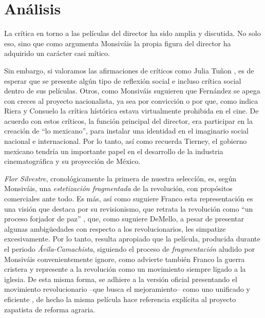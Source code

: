 \section{Análisis}
La crítica en torno a las películas del director ha sido amplia y discutida. No solo eso, sino que como argumenta Monsiváis\autocite[445]{cosio_villegas_notas_1976} la propia figura del director ha adquirido un carácter casi mítico.

Sin embargo, si valoramos las afirmaciones de críticos como Julia Tuñon\autocite[466]{pablos_escuela_1998-1}\autocite[466]{pablos_escuela_1998-1}
 , es de esperar que se presente algún tipo de reflexión social e incluso crítica social dentro de sus películas. 
Otros, como Monsiváis\autocite[444]{cosio_villegas_notas_1976}
suguieren que Fernández se apega con creces 
al proyecto nacionalista, ya sea por convicción o por que, como indica Riera\autocite[111]{garcia_riera_historia_1992}
y  Consuelo\autocite[179]{guerrero_imagen_2005}
la crítica hístórica estava virtualmente prohibida en el cine. De acuerdo con estos críticos, la función principal del director, era participar en la creación de ``lo mexicano'', para instalar una identidad en el imaginario social nacional e internacional\autocite[12]{silva_escobar_epoca_2011}.
Por lo tanto, así como recuerda Tierney, el gobierno mexicano tendría un importante papel en el desarrollo de la industria cinematográfica y su proyección de México\autocite[35]{tierney_myths_2002}.

\emph{Flor Silvestre}, cronológicamente\autocite[17]{garcia_riera_historia_1992}
la primera de nuestra seleccíón, es, según Monsiváis, 
una \emph{estetización fragmentada}\autocite[440]{cosio_villegas_notas_1976}
 de la revolución, con propósitos comerciales ante todo\autocite[439]{cosio_villegas_notas_1976}.
Es más, así como suguiere Franco esta representación es una visión que destaca por su revisionismo,\autocite[369]{sanchez_vi._2010}
 que retrata la revolución como ``un proceso forjador de paz''\autocite[370]{sanchez_vi._2010}
, que, como suguiere DeMello, a pesar de presentar algunas ambigüedades con respecto a los revolucionarios, les simpatize excesivamente\autocite[87]{demello_unfinished_2001}. 
Por lo tanto, resulta apropiado que la película, producida durante el periodo \emph{Ávila-Camachista}, siguiendo el proceso de \emph{fragmentación} aludido por Monsiváis\autocite[440]{cosio_villegas_notas_1976}
convenientemente ignore, como advierte también Franco la guerra cristera y represente a la revolución como un movimiento siempre ligado a la iglesia\autocite[370]{sanchez_vi._2010}.
De esta misma forma, se adhiere a la versión oficial
presentando el movimiento revolucionario --que busca el mejoramiento-- como uno unificado y eficiente\autocite[42:38-43:20]{fernandez_flor_1943}
, de hecho la misma película hace referencia explícita al proyecto zapatista de reforma agraria\autocite[11:14]{fernandez_flor_1943}.

